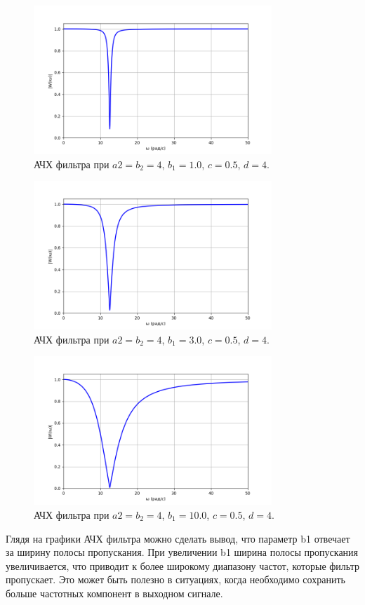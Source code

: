 \documentclass[a4paper]{article}
\begin{document}
\begin{figure}[H]
  \centering
  \includegraphics[width=0.8\textwidth]{src/task_1_2/1. ach_157_1_0.5.png}
  \caption{АЧХ фильтра при $a2 = b_2 = 4$, $b_1=1.0$, $c=0.5$, $d=4$.}
\end{figure}
\begin{figure}[H]
  \centering
  \includegraphics[width=0.8\textwidth]{src/task_1_2/1. ach_157_3_0.5.png}
  \caption{АЧХ фильтра при $a2 = b_2 = 4$, $b_1=3.0$, $c=0.5$, $d=4$.}
\end{figure}
\begin{figure}[H]
  \centering
  \includegraphics[width=0.8\textwidth]{src/task_1_2/1. ach_157_10_0.5.png}
  \caption{АЧХ фильтра при $a2 = b_2 = 4$, $b_1=10.0$, $c=0.5$, $d=4$.}
\end{figure}
\noindent Глядя на графики АЧХ фильтра можно сделать вывод, что параметр b1 отвечает за ширину полосы пропускания. При увеличении b1 ширина полосы пропускания увеличивается, что приводит к более широкому диапазону частот, которые фильтр пропускает. Это может быть полезно в ситуациях, когда необходимо сохранить больше частотных компонент в выходном сигнале.
\end{document}
